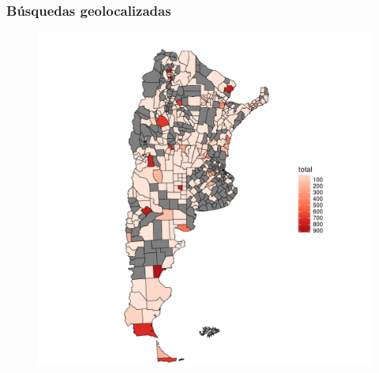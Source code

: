 \begin{frame}[c]\frametitle{Búsquedas geolocalizadas}


\begin{figure}
    \includegraphics[height=0.5\textheight]{../src/images/mapadepartamentos.pdf}
    \label{fig:mapaDepartamentos}
\end{figure}





\end{frame}
